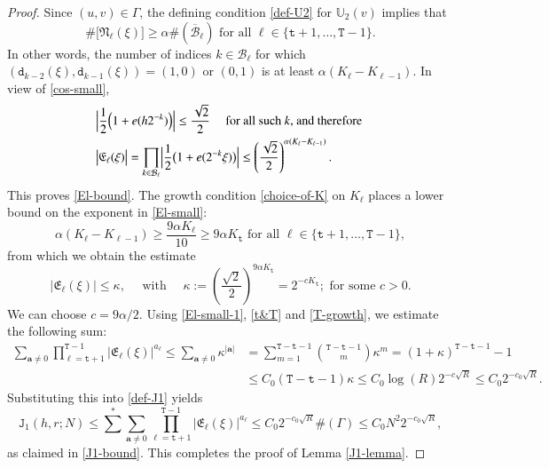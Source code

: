 \documentclass[12pt, twoside]{article}
\theoremstyle{definition}
\numberwithin{equation}{section}
\begin{document}
\begin{proof}
Since $(u,v) \in \Gamma$, the defining condition \eqref{def-U2} for $\mathbb U_2(v)$ implies that  
\[ \# \bigl[ \mathfrak N_{\ell}(\xi)\bigr] \geq \alpha \#(\overline{\mathcal B}_{\ell}) \text{ for all } \ell \in \{\mathtt t+1, \ldots, \mathtt T-1\}.  \] 
In other words, the number of indices $k \in \mathcal B_{\ell}$ for which $(\mathtt d_{k-2}(\xi), \mathtt d_{k-1}(\xi)) = (1,0)$ or $(0,1)$ is at least $\alpha(K_{\ell} - K_{\ell-1})$. In view of \eqref{cos-small},
\begin{align} 
&\Bigl| \frac{1}{2} \Bigl(1 + e(h2^{-k})\Bigr) \Bigr|  \leq \frac{\sqrt{2}}{2}  \quad \text{ for all such $k$, and therefore } \nonumber \\   
&\bigl|\mathfrak E_{\ell}(\xi) \bigr| = \prod_{k \in \mathcal B_{\ell}} \Bigl| \frac{1}{2} \bigl(1 + e(2^{-k} \xi )\bigr) \Bigr| \leq \left( \frac{\sqrt{2}}{2}\right)^{\alpha(K_{\ell} - K_{\ell-1})}. \label{El-small}
\end{align} 
This proves \eqref{El-bound}.
 \vskip0.1in
\noindent The growth condition \eqref{choice-of-K} on $K_{\ell}$ places a lower bound on the exponent in \eqref{El-small}: 
\[ \alpha(K_{\ell} - K_{\ell-1}) \geq \frac{9\alpha K_{\ell}}{10} \geq 9\alpha K_{\mathtt t} \text{ for all } \ell \in \{\mathtt t+1, \ldots, \mathtt T-1\},  \] 
from which we obtain the estimate
\begin{equation} \label{El-small-1}
\bigl|\mathfrak E_{\ell}(\xi) \bigr| \leq \kappa, \quad \text{ with } \quad \kappa := \left(\frac{\sqrt{2}}{2} \right)^{9 \alpha K_{\mathtt t}} = 2^{-c K_{\mathtt t}}; \text{ for some }  c > 0.  
\end{equation}
We can choose $c = 9 \alpha/2$. 
\vskip0.1in 
\noindent Using \eqref{El-small-1}, \eqref{t&T} and \eqref{T-growth}, we estimate the following sum: 
\begin{align*}
\sum_{\mathbf a \ne 0} \prod_{\ell = \mathtt t +1}^{\mathtt T-1} \bigl|\mathfrak E_{\ell}(\xi) \bigr|^{a_{\ell}} \leq \sum_{\mathbf a \ne 0} \kappa^{|\mathbf a|} &= \sum_{m=1}^{\mathtt T-\mathtt t-1} {{\mathtt T-\mathtt t-1}\choose{m}} \kappa^m = (1 + \kappa)^{\mathtt T- \mathtt t-1} -1 \\
&\leq C_0 (\mathtt T- \mathtt t-1) \kappa \leq C_0 \log(R) 2^{- c \sqrt{R}} \leq C_0 2^{- c_0 \sqrt{R}}.
\end{align*}
Substituting this into \eqref{def-J1} yields 
\[ \mathtt J_1(h, r; N) \leq \sum^{\ast} \sum_{\mathbf a \ne 0} \prod_{\ell = \mathtt t +1}^{\mathtt T-1} \bigl|\mathfrak E_{\ell}(\xi) \bigr|^{a_{\ell}} \leq C_0 2^{-c_0 \sqrt{R}} \#(\Gamma) \leq C_0 N^2 2^{- c_0 \sqrt{R}},\]
as claimed in \eqref{J1-bound}. This completes the proof of Lemma \ref{J1-lemma}.    
\end{proof} 
\end{document}
